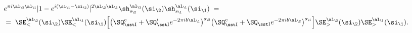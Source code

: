 \begin{equation}\begin{aligned}
{}& e^{\pi i \al_\2\al_\1}
|1-e^{i(\si_\1-\si_\2)}|^{2\al_\2\al_\1}
 \sh_{s_\2}^{\al_\2}(\si_\2)\sh_{s_\1}^{\al_\1}(\si_\1)\;=\;\\
& =\; \SE_<^{\al_\2}(\si_\2)\SE_<^{\al_\1}(\si_\1)
\Big[\big(\SQ_{\rm\sst I}^c{}+\SQ_{\rm\sst I}'{}e^{-2\pi ib\al_\1}\big)^{s_\2}
\big(\SQ_{\rm\sst I}^c{}+\SQ_{\rm\sst I}e^{-2\pi ib\al_\2}\big)^{s_\1}\Big]
\SE_>^{\al_\2}(\si_\2)\SE_>^{\al_\1}(\si_\1). 
\end{aligned}
\end{equation}

